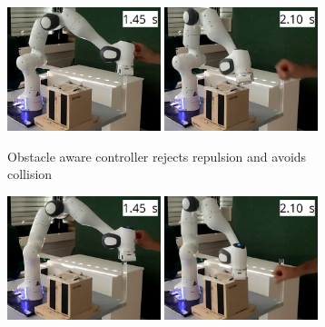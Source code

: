 \begin{figure}
    \centering
   \begin{subfigure}{\columnwidth}
    \includegraphics[width=0.49\textwidth]{figures/franka_sequence/franka_obstacle_aware016}\hfill%
    \includegraphics[width=0.49\textwidth]{figures/franka_sequence/franka_obstacle_aware020}
      \caption{Obstacle aware controller rejects repulsion and avoids collision}
      \label{fig:franka_sequence_obstacle_aware}
    \end{subfigure}
	\begin{subfigure}{\columnwidth}
    \includegraphics[width=0.49\textwidth]{figures/franka_sequence/franka_velocity_conserving021}\hfill%
    \includegraphics[width=0.49\textwidth]{figures/franka_sequence/franka_velocity_conserving025}\hfill%

\end{subfigure}
\end{figure}
